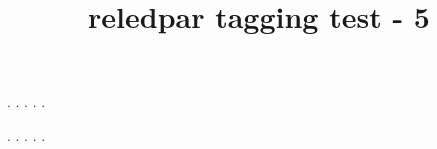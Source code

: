 \documentclass[a5paper,11pt]{article}
\title{reledpar tagging test - 5}
\begin{document}
\begin{pages}
    \begin{Leftside}
        \beginnumbering
            . \blindtext[21]
            \pend{}. \blindtext[10]
            \pend{}. \blindtext[6]
            \pend{}. \blindtext[6]
            \pend
            . \blindtext[6]
            \pend
        \endnumbering
    \end{Leftside}
    \begin{Rightside}
        \beginnumbering
            . \blindtext[22]\footnoteAmk
            \pend{}. \blindtext[12]
            \pend{}. \blindtext[12]
            \pend
            . \blindtext[12]
            \pend
            . \blindtext[12]
            \pend
        \endnumbering
    \end{Rightside}
\end{pages}
\Pages
\end{document}
